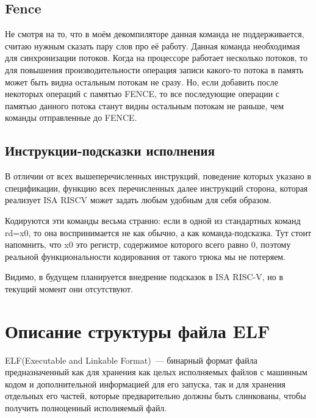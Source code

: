 \documentclass[14pt, russian, onesize]{extreport}
\begin{document}
\subsection*{Fence}
Не смотря на то, что в моём декомпиляторе данная команда не поддерживается,
считаю нужным сказать пару слов про её работу. 
Данная команда необходимая для синхронизации потоков. Когда на процессоре
работает несколько потоков, то для повышения производительности 
операция записи какого-то потока в память может быть видна остальным
потокам не сразу. Но, если добавить после некоторых операций с памятью
FENCE, то все последующие операции с памятью данного потока станут
видны остальным потокам не раньше, чем команды отправленные до FENCE.

\subsection*{Инструкции-подсказки исполнения}
В отличии от всех вышеперечисленных инструкций, поведение которых 
указано в спецификации, функцию всех перечисленных далее инструкций
сторона, которая реализует ISA RISCV может задать любым удобным
для себя образом. 

Кодируются эти команды весьма странно: если в одной из стандартных
команд rd=x0, то она воспринимается не как обычно, а как команда-подсказка.
Тут стоит напомнить, что x0 это регистр, содержимое которого всего равно
0, поэтому реальной функциональности кодирования от такого трюка мы не потеряем.

Видимо, в будущем планируется внедрение подсказок в ISA RISC-V, но 
в текущий момент они отсутствуют.

\section*{Описание структуры файла ELF}
ELF(Executable and Linkable Format)~--- бинарный формат файла предназначенный
как для хранения как целых исполняемых файлов с машинным кодом и дополнительной
информацией для его запуска, так и для хранения отдельных его частей, которые
предварительно должны быть слинкованы, чтобы получить полноценный исполняемый
файл. 
\end{document}
